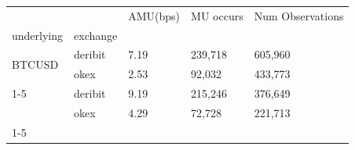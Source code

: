 \begin{tabular}{lllll}
\toprule
 &  & AMU(bps) & MU occurs & Num Observations \\
underlying & exchange &  &  &  \\
\midrule
\multirow[t]{2}{*}{BTCUSD} & deribit & 7.19 & 239,718 & 605,960 \\
 & okex & 2.53 & 92,032 & 433,773 \\
\cline{1-5}
\multirow[t]{2}{*}{ETHUSD} & deribit & 9.19 & 215,246 & 376,649 \\
 & okex & 4.29 & 72,728 & 221,713 \\
\cline{1-5}
\bottomrule
\end{tabular}
